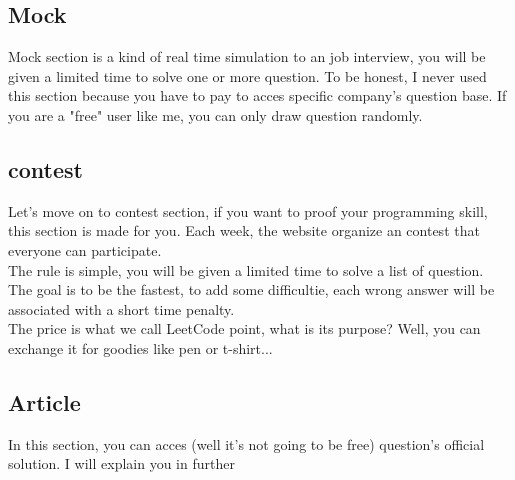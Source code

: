 \documentclass[12pt, letterpaper]{article}
\begin{document}
\subsection{Mock}
Mock section is a kind of real time simulation to an job interview, you will be given a limited time to solve one or more question. To be honest, I never used this section because you have to pay to acces specific company's question base. If you are a "free" user like me, you can only draw question randomly.

\subsection{contest}
Let's move on to contest section, if you want to proof your programming skill, this section is made for you.
Each week, the website organize an contest that everyone can participate. \\
The rule is simple, you will be given a limited time to solve a list of question.\\
The goal is to be the fastest, to add some difficultie, each wrong answer will be associated with a short time penalty.\\
The price is what we call LeetCode point, what is its purpose? Well, you can exchange it for goodies like pen or t-shirt...

\subsection{Article}
In this section, you can acces (well it's not going to be free) question's official solution.
I will explain you in further
\end{document}
